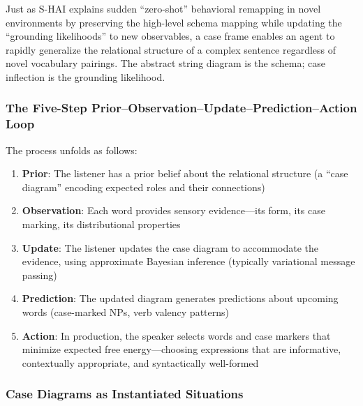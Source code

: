 \documentclass[
]{article}
\providecommand{\tightlist}{%
  \setlength{\itemsep}{0pt}\setlength{\parskip}{0pt}}
\begin{document}
Just as S-HAI explains sudden ``zero-shot'' behavioral remapping in
novel environments by preserving the high-level schema mapping while
updating the ``grounding likelihoods'' to new observables, a case frame
enables an agent to rapidly generalize the relational structure of a
complex sentence regardless of novel vocabulary pairings. The abstract
string diagram is the schema; case inflection is the grounding
likelihood.

\subsubsection{The Five-Step
Prior--Observation--Update--Prediction--Action
Loop}\label{the-five-step-priorobservationupdatepredictionaction-loop}

The process unfolds as follows:

\begin{enumerate}
\def\labelenumi{\arabic{enumi}.}
\tightlist
\item
  \textbf{Prior}: The listener has a prior belief about the relational
  structure (a ``case diagram'' encoding expected roles and their
  connections)
\item
  \textbf{Observation}: Each word provides sensory evidence---its form,
  its case marking, its distributional properties
\item
  \textbf{Update}: The listener updates the case diagram to accommodate
  the evidence, using approximate Bayesian inference (typically
  variational message passing)
\item
  \textbf{Prediction}: The updated diagram generates predictions about
  upcoming words (case-marked NPs, verb valency patterns)
\item
  \textbf{Action}: In production, the speaker selects words and case
  markers that minimize expected free energy---choosing expressions that
  are informative, contextually appropriate, and syntactically
  well-formed
\end{enumerate}

\subsubsection{Case Diagrams as Instantiated
Situations}\label{case-diagrams-as-instantiated-situations}
\end{document}
